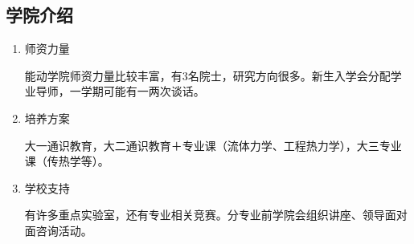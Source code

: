 \documentclass[zihao=-4,fontset=none]{Beautybook-CN}
\begin{document}
\subsection{学院介绍}

\begin{enumerate}
	\item 师资力量
	      	      	          
	      能动学院师资力量比较丰富，有3名院士，研究方向很多。新生入学会分配学业导师，一学期可能有一两次谈话。
	      	      	          
	\item 培养方案
	      	      	          
	      大一通识教育，大二通识教育＋专业课（流体力学、工程热力学），大三专业课（传热学等）。
	      	      
	      	      	          
	\item 学校支持
	      	      
	      有许多重点实验室，还有专业相关竞赛。分专业前学院会组织讲座、领导面对面咨询活动。
\end{enumerate}
\end{document}
